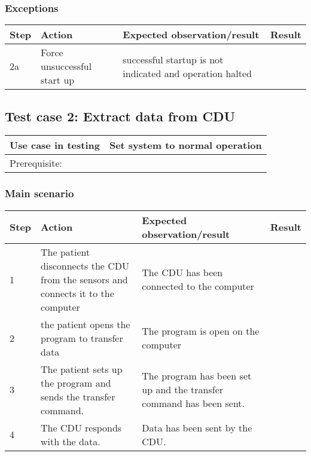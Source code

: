 \subsubsection{Exceptions}
\begin{table}[H]
    \begin{tabular}{|l|p{7cm}|p{5cm}|l|}
    \hline
    Step & Action & Expected observation/result & Result \\ \hline
    2a & Force unsuccessful start up & successful startup is not indicated and operation halted & ~ \\ \hline
    \end{tabular}
\end{table}


\subsection{Test case 2: Extract data from CDU}
\begin{table}[H]
    \begin{tabular}{|l|p{7cm}|}
    \hline
    Use case in testing & Set system to normal operation \\ \hline
    Prerequisite: & ~ \\ \hline
    \end{tabular}
\end{table}

\subsubsection{Main scenario}
\begin{table}[H]
    \begin{tabular}{|l|p{7cm}|p{5cm}|l|}
    \hline
    Step & Action & Expected observation/result & Result \\ \hline
    1 & The patient disconnects the CDU from the sensors and connects it to the computer & The CDU has been connected to the computer & ~ \\ \hline
    2 & the patient opens the program to transfer data & The program is open on the computer & ~ \\ \hline
    3 & The patient sets up the program and sends the transfer command. & The program has been set up and the transfer command has been sent. & ~ \\ \hline
    4 & The CDU responds with the data. & Data has been sent by the CDU. & ~ \\ \hline
    \end{tabular}
\end{table}

